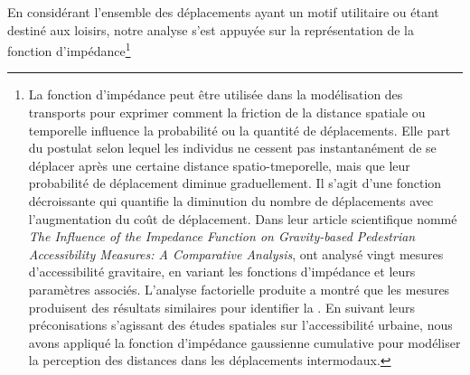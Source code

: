 \begin{refsegment}
En considérant l'ensemble des déplacements ayant un motif utilitaire ou étant destiné aux loisirs, notre analyse s'est appuyée sur la représentation de la fonction d'impédance\footnote{
    La fonction d'impédance peut être utilisée dans la modélisation des transports pour exprimer comment la friction de la distance spatiale ou temporelle influence la probabilité ou la quantité de déplacements. Elle part du postulat selon lequel les individus ne cessent pas instantanément de se déplacer après une certaine distance spatio-tmeporelle, mais que leur probabilité de déplacement diminue graduellement. Il s'agit d'une fonction décroissante qui quantifie la diminution du nombre de déplacements avec l'augmentation du coût de déplacement. Dans leur article scientifique nommé \foreignlanguage{english}{\textsl{The Influence of the Impedance Function on Gravity-based Pedestrian Accessibility Measures: A Comparative Analysis}}, \textcolor{blue}{\textcite[758]{vale_influence_2017}} ont analysé vingt mesures d'accessibilité gravitaire, en variant les fonctions d'impédance et leurs paramètres associés. L'analyse factorielle produite a montré que les mesures produisent des résultats similaires pour identifier la . En suivant leurs préconisations s'agissant des études spatiales sur l'accessibilité urbaine, nous avons appliqué la fonction d'impédance gaussienne cumulative pour modéliser la perception des distances dans les déplacements intermodaux.
}
\end{refsegment}
